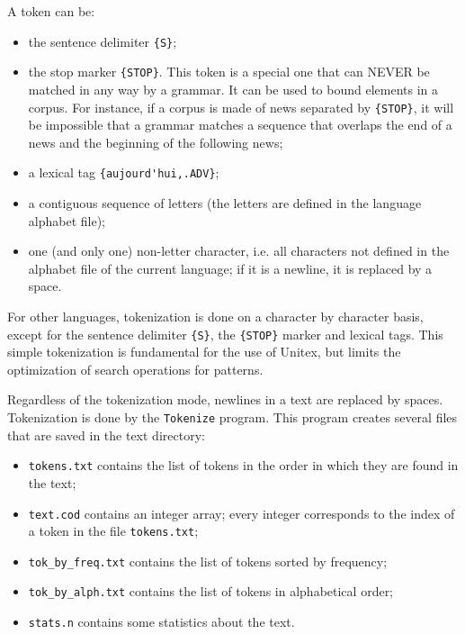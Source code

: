 \bigskip
\noindent A token can be:
\begin{itemize}
  \item the sentence delimiter \verb+{S}+; \item the stop marker
  \verb+{STOP}+. This token is a special one that can
  NEVER be matched in any way by a grammar. It can be used to bound elements
  in a corpus. For instance, if a corpus is made of news separated by
  \verb+{STOP}+, it will be impossible that a grammar matches a sequence that
  overlaps the end of a news and the beginning of the following news;
  \item a lexical tag \verb+{aujourd'hui,.ADV}+; \item a contiguous sequence of
  letters (the letters are defined in the language alphabet file);
  \item one (and only one) non-letter character, i.e. all characters not defined
  in the alphabet file of the current language; if it is a newline, it is replaced by
  a space.
\end{itemize}

\bigskip
\noindent For other languages, tokenization is done on a character by character
basis, except for the sentence delimiter \verb+{S}+, the \verb+{STOP}+ marker
and lexical tags. This simple tokenization is fundamental for the use of Unitex,
but limits the optimization of search operations for patterns.

\bigskip
\noindent Regardless of the tokenization mode, newlines in a text are
replaced by spaces. Tokenization is done by the \verb+Tokenize+
 program. This program creates several
files that are saved in the text directory:
\begin{itemize}
  \item \verb+tokens.txt+ contains the list of tokens in the order in which they are found in the text;
  \item \verb+text.cod+ contains an integer array; every
  integer corresponds to the index of a token in the file \verb+tokens.txt+;
  \item \verb+tok_by_freq.txt+ contains the list of tokens sorted by frequency;
  \item \verb+tok_by_alph.txt+ contains the list of tokens in alphabetical order;
  \item \verb+stats.n+ contains some statistics about the text. 
\end{itemize}

